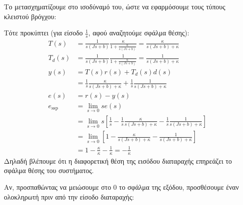 \documentclass[11pt,a4paper,notitlepage,fleqn]{article}
\begin{document}
Το μετασχηματίζουμε στο ισοδύναμό του, ώστε να εφαρμόσουμε τους τύπους κλειστού βρόγχου:


Τότε προκύπτει (για είσοδο \( \frac{1}{s} \), αφού αναζητούμε σφάλμα θέσης):
\begin{align*}
    T(s) &= \frac{1}{s(Js+b)}\frac{κ}{1+\frac{κ}{s(Js+b)}} 
    = \frac{κ}{s(Js+b)+κ}\\
    T_{d}(s) &= \frac{1}{s(Js+b)}\frac{1}{1+\frac{κ}{s(Js+b)}}
    = \frac{1}{s(Js+b)+κ}
     \\
    y(s) &= T(s)r(s) + T_d(s)d(s)
    \\ &= \frac{1}{s}\frac{κ}{s(Js+b)+κ} + \frac{1}{s}\frac{1}{s(Js+b)+κ}
    \\
    e(s) &= r(s) - y(s) \\
    e_{\mathrm{ssp}} &= \lim_{s\to 0} se(s)
    \\ &= \lim_{s \to 0} s\left[
    \frac{1}{s} - \frac{1}{s}\frac{κ}{s(Js+b)+κ} - \frac{1}{s}\frac{1}{s(Js+b)+κ}
    \right]
    \\
    &= \lim_{s\to 0} \left[
    1 - \frac{κ}{s(Js+b)+κ} - \frac{1}{s(Js+b)+κ}
    \right] \\
    &= 1-\frac{κ}{κ}-\frac{1}{κ} = -\frac{1}{κ}
\end{align*}
Δηλαδή βλέπουμε ότι η διαφορετική θέση της εισόδου διαταραχής επηρεάζει το σφάλμα θέσης του
συστήματος.

Αν, προσπαθώντας να μειώσουμε στο 0 το σφάλμα της εξόδου, προσθέσουμε έναν ολοκληρωτή
πριν από την είσοδο διαταραχής:
\end{document}
